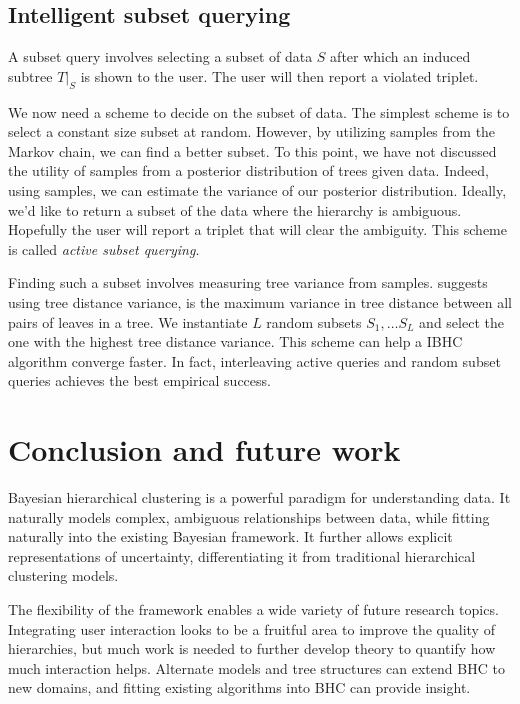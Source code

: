 \documentclass{article}
\begin{document}
\subsection{Intelligent subset querying}

A subset query involves selecting a subset of data $S$
after which an induced subtree $T|_S$ is shown to the user.
The user will then report a violated triplet.

We now need a scheme to decide on the subset of data.
The simplest scheme is to select a constant size
subset at random.
However, by utilizing samples from the Markov chain,
we can find a better subset.
To this point, we have not discussed the utility
of samples from a posterior distribution of trees given data.
Indeed, using samples, we can estimate the variance of
our posterior distribution. Ideally, we'd like to return a subset
of the data where the hierarchy is ambiguous. Hopefully
the user will report a triplet that will clear the ambiguity.
This scheme is called \emph{active subset querying}.

Finding such a subset involves measuring tree variance from samples.
\citep{Vikram2016} suggests using tree distance variance,
is the maximum variance in tree distance between all
pairs of leaves in a tree. We instantiate $L$
random subsets $S_1, \ldots S_L$ and select
the one with the highest tree distance variance.
This scheme can help a IBHC algorithm converge faster.
In fact, interleaving active queries
and random subset queries achieves the best empirical success.

\section{Conclusion and future work}

Bayesian hierarchical clustering is a powerful
paradigm for understanding data.
It naturally
models complex, ambiguous relationships between data,
while fitting naturally into the existing
Bayesian framework.
It further allows explicit representations of uncertainty,
differentiating it from traditional hierarchical clustering
models.

The flexibility of the framework enables a wide
variety of future research topics. Integrating user interaction
looks to be a fruitful area to improve the quality of hierarchies,
but much work is needed to further develop theory to
quantify how much interaction helps.
Alternate models and tree structures can extend
BHC to new domains, and fitting existing algorithms
into BHC can provide insight.



\end{document}
